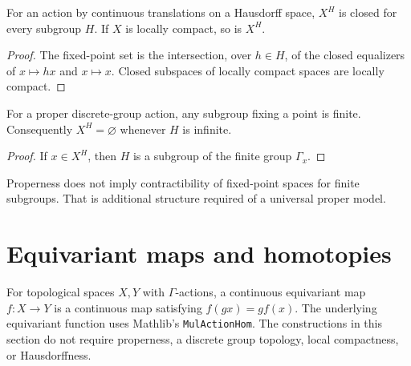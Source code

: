 \begin{proposition}\label{prop:fixed-point-space-closed}
For an action by continuous translations on a Hausdorff space, $X^H$
is closed for every subgroup $H$. If $X$ is locally compact, so is $X^H$.
\end{proposition}
\begin{proof}
\leanok
The fixed-point set is the intersection, over $h\in H$, of the closed
equalizers of $x\mapsto hx$ and $x\mapsto x$. Closed subspaces of locally
compact spaces are locally compact.
\end{proof}

\begin{proposition}\label{prop:proper-infinite-fixed-points}
For a proper discrete-group action, any subgroup fixing a point is finite.
Consequently $X^H=\varnothing$ whenever $H$ is infinite.
\end{proposition}
\begin{proof}
\leanok
If $x\in X^H$, then $H$ is a subgroup of the finite group $\Gamma_x$.
\end{proof}

Properness does not imply contractibility of fixed-point spaces for finite
subgroups. That is additional structure required of a universal proper model.

\section{Equivariant maps and homotopies}

\begin{definition}\label{def:equivariant-map}
\leanok
For topological spaces $X,Y$ with $\Gamma$-actions, a continuous equivariant
map $f:X\to Y$ is a continuous map satisfying $f(gx)=gf(x)$.
The underlying equivariant function uses Mathlib's \texttt{MulActionHom}.
The constructions in this section do not require properness, a discrete
group topology, local compactness, or Hausdorffness.
\end{definition}

